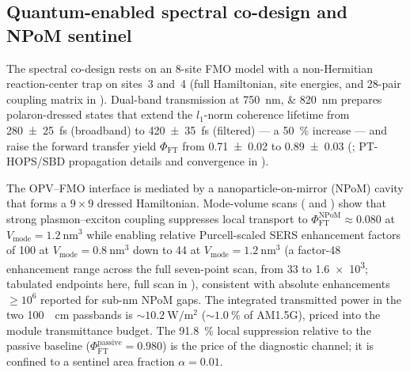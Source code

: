 \documentclass[preprint,12pt]{elsarticle}
\begin{document}
\subsection{Quantum-enabled spectral co-design and NPoM sentinel}

The spectral co-design rests on an 8-site FMO model with a non-Hermitian reaction-center trap on sites~3 and~4 (full Hamiltonian, site energies, and 28-pair coupling matrix in ). Dual-band transmission at \qtylist{750;820}{\nm} prepares polaron-dressed states that extend the $l_1$-norm coherence lifetime from \qty{280(25)}{\fs} (broadband) to \qty{420(35)}{\fs} (filtered) --- a \qty{50}{\percent} increase --- and raise the forward transfer yield $\Phi_{\mathrm{FT}}$ from \num{0.71(2)} to \num{0.89(3)} (; PT-HOPS/SBD propagation details and convergence in ).

The OPV--FMO interface is mediated by a nanoparticle-on-mirror (NPoM) cavity that forms a $9\times 9$ dressed Hamiltonian. Mode-volume scans ( and ) show that strong plasmon--exciton coupling suppresses local transport to $\Phi_{\mathrm{FT}}^{\mathrm{NPoM}} \approx 0.080$ at $V_{\mathrm{mode}} = \qty{1.2}{\nm\cubed}$ while enabling relative Purcell-scaled SERS enhancement factors of \num{100} at $V_{\mathrm{mode}} = \qty{0.8}{\nm\cubed}$ down to \num{44} at $V_{\mathrm{mode}} = \qty{1.2}{\nm\cubed}$ (a factor-\num{48} enhancement range across the full seven-point scan, from \num{33} to \num{1.6e3}; tabulated endpoints here, full scan in ), consistent with absolute enhancements $\geq 10^6$ reported for sub-nm NPoM gaps. The integrated transmitted power in the two \qty{100}{\per\cm} passbands is $\sim\qty{10.2}{\W\per\m\squared}$ ($\sim\qty{1.0}{\percent}$ of AM1.5G), priced into the module transmittance budget. The \qty{91.8}{\percent} local suppression relative to the passive baseline ($\Phi_{\mathrm{FT}}^{\mathrm{passive}} = 0.980$) is the price of the diagnostic channel; it is confined to a sentinel area fraction $\alpha = 0.01$.
\end{document}
